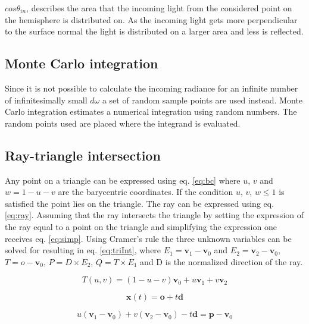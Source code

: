 \documentclass[twocolumn]{article}
\begin{document}
\vspace*{1em}

$cos\theta_{in}$, describes the area that the incoming light from the considered point on the hemisphere is distributed on. As the incoming light gets more perpendicular to the surface normal the light is distributed on a larger area and less is reflected.

\subsection{Monte Carlo integration}
	Since it is not possible to calculate the incoming radiance for an infinite number of infinitesimally small $d\omega$ a set of random sample points are used instead. Monte Carlo integration estimates a numerical integration using random numbers. The random points used are placed where the integrand is evaluated. 

\subsection{Ray-triangle intersection}
Any point on a triangle can be expressed using eq. \ref{eq:bc} where $u$, $v$ and $ w = 1 - u - v$ are the barycentric coordinates. If the condition $u$, $v$, $w \leq 1$ is satisfied the point lies on the triangle. The ray can be expressed using eq. \ref{eq:ray}. Assuming that the ray intersects the triangle by setting the expression of the ray equal to a point on the triangle and simplifying the expression one receives eq. \ref{eq:simp}. Using Cramer's rule the three unknown variables can be solved for resulting in eq. \ref{eq:triInt}, where $E_1 = \mathbf{v}_1 - \mathbf{v}_0$ and $E_2 = \mathbf{v}_2 - \mathbf{v}_0$, $T = o - \mathbf{v}_0$, $P = D \times E_2$, $Q = T \times E_1$ and D is the normalized direction of the ray.

\begin{equation}
	\label{eq:bc}	
	T(u,v) = (1 - u - v)\mathbf{v}_0 + u\mathbf{v}_1 + v\mathbf{v}_2
\end{equation}

\begin{equation}
	\label{eq:ray}
	\mathbf{x}(t) = \mathbf{o} + t\mathbf{d}
\end{equation}

\begin{equation}
	\label{eq:simp}
	u(\mathbf{v}_1 - \mathbf{v}_0) + v(\mathbf{v}_2 - \mathbf{v}_0) - t\mathbf{d} = \mathbf{p} - \mathbf{v}_0
\end{equation}
\end{document}
